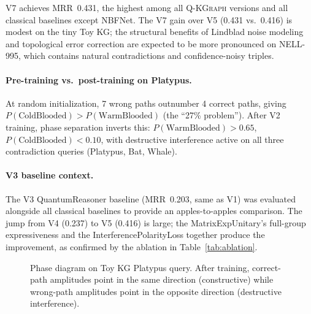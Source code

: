 \documentclass[runningheads]{llncs}
\newcommand{\QR}{\textsc{Q-KGraph}}
\begin{document}
V7 achieves MRR~0.431, the highest among all \QR{} versions and all
classical baselines except NBFNet.  The V7 gain over V5 (0.431 vs.\ 0.416)
is modest on the tiny Toy KG; the structural benefits of Lindblad noise
modeling and topological error correction are expected to be more pronounced
on NELL-995, which contains natural contradictions and confidence-noisy
triples.

\paragraph{Pre-training vs.\ post-training on Platypus.}
At random initialization, 7 wrong paths outnumber 4 correct paths, giving
$P(\text{ColdBlooded})>P(\text{WarmBlooded})$ (the ``27\% problem'').
After V2 training, phase separation inverts this: $P(\text{WarmBlooded})>0.65$,
$P(\text{ColdBlooded})<0.10$, with destructive interference active on all
three contradiction queries (Platypus, Bat, Whale).

\paragraph{V3 baseline context.}
The V3 QuantumReasoner baseline (MRR~0.203, same as V1) was evaluated alongside
all classical baselines to provide an apples-to-apples comparison.  The
jump from V4 (0.237) to V5 (0.416) is large; the MatrixExpUnitary's full-group
expressiveness and the InterferencePolarityLoss together produce the
improvement, as confirmed by the ablation in Table~\ref{tab:ablation}.

\begin{figure}[t]
\centering
\caption{Phase diagram on Toy KG Platypus query.  After training, correct-path
amplitudes point in the same direction (constructive) while wrong-path
amplitudes point in the opposite direction (destructive interference).}
\label{fig:toy}
\end{figure}
\end{document}
